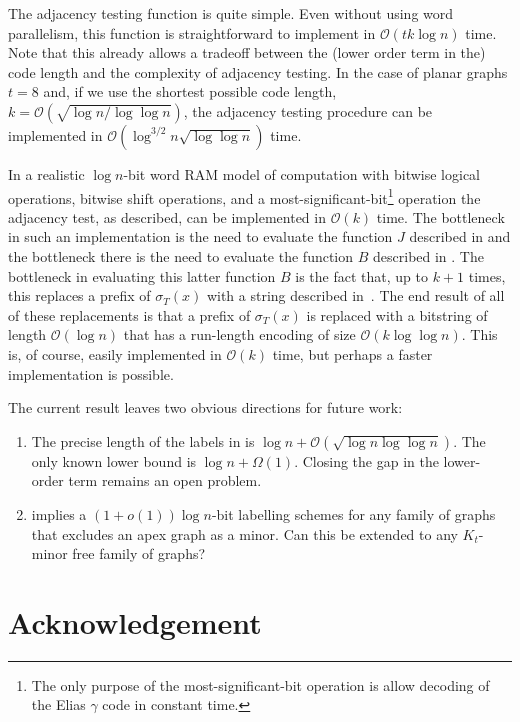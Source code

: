 \documentclass[kpfonts]{patmorin}
\newcommand{\snote}[1]{\fcolorbox{red}{yellow}{#1}}
\newcommand{\Oh}{\mathcal{O}}
\begin{document}
The adjacency testing function is quite simple. Even without using word parallelism, this function is straightforward to implement in $\Oh(tk\log n)$ time.  Note that this already allows a tradeoff between the (lower order term in the) code length and the complexity of adjacency testing.
In the case of planar graphs $t=8$ and, if we use the shortest possible code length, $k=\Oh(\sqrt{\log n / \log\log n})$, the adjacency testing procedure can be implemented in $\Oh(\log^{3/2} n\sqrt{\log\log n})$ time.

In a realistic $\log n$-bit word RAM model of computation with bitwise logical operations, bitwise shift operations, and a most-significant-bit\footnote{The only purpose of the most-significant-bit operation is allow decoding of the Elias $\gamma$ code in constant time.} operation the adjacency test, as described, can be implemented in $\Oh(k)$ time.  The bottleneck in such an implementation is the need to evaluate the function $J$ described in  and the bottleneck there is the need to evaluate the function $B$ described in .  The bottleneck in evaluating this latter function $B$ is the fact that, up to $k+1$ times, this replaces a prefix of $\sigma_T(x)$ with a string described in~.  The end result of all of these replacements is that a prefix of $\sigma_T(x)$ is replaced with a bitstring of length $\Oh(\log n)$ that has a run-length encoding of size $\Oh(k\log\log n)$.  This is, of course, easily implemented in $\Oh(k)$ time, but perhaps a faster implementation is possible.

The current result leaves two obvious directions for future work:
\begin{enumerate}
  \item The precise length of the labels in  is $\log n + \Oh(\sqrt{\log n\log\log n})$.  The only known lower bound is $\log n + \Omega(1)$.  Closing the gap in the lower-order term remains an open problem.

  \item {} implies a $(1+o(1))\log n$-bit labelling schemes for any family of graphs that excludes an apex graph as a minor.  Can this be extended to any $K_t$-minor free family of graphs?
\end{enumerate}

\section*{Acknowledgement}
\end{document}
